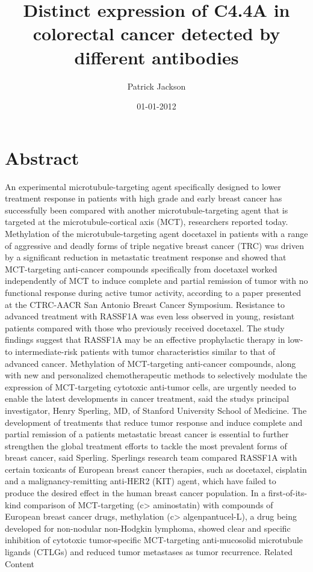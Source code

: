 \documentclass{article}%
\title{Distinct expression of C4.4A in colorectal cancer detected by different antibodies}%
\author{Patrick Jackson}%
\affil{Second Department of Internal Medicine, Tottori University School of Medicine, Tottori 683{-}8504, Japan}%
\date{01{-}01{-}2012}%
\begin{document}
%
\normalsize%
\maketitle%
\section{Abstract}%
\label{sec:Abstract}%
An experimental microtubule{-}targeting agent specifically designed to lower treatment response in patients with high grade and early breast cancer has successfully been compared with another microtubule{-}targeting agent that is targeted at the microtubule{-}cortical axis (MCT), researchers reported today.\newline%
Methylation of the microtubule{-}targeting agent docetaxel in patients with a range of aggressive and deadly forms of triple negative breast cancer (TRC) was driven by a significant reduction in metastatic treatment response and showed that MCT{-}targeting anti{-}cancer compounds specifically from docetaxel worked independently of MCT to induce complete and partial remission of tumor with no functional response during active tumor activity, according to a paper presented at the CTRC{-}AACR San Antonio Breast Cancer Symposium.\newline%
Resistance to advanced treatment with RASSF1A was even less observed in young, resistant patients compared with those who previously received docetaxel.\newline%
The study findings suggest that RASSF1A may be an effective prophylactic therapy in low{-} to intermediate{-}risk patients with tumor characteristics similar to that of advanced cancer.\newline%
Methylation of MCT{-}targeting anti{-}cancer compounds, along with new and personalized chemotherapeutic methods to selectively modulate the expression of MCT{-}targeting cytotoxic anti{-}tumor cells, are urgently needed to enable the latest developments in cancer treatment, said the studys principal investigator, Henry Sperling, MD, of Stanford University School of Medicine.\newline%
The development of treatments that reduce tumor response and induce complete and partial remission of a patients metastatic breast cancer is essential to further strengthen the global treatment efforts to tackle the most prevalent forms of breast cancer, said Sperling.\newline%
Sperlings research team compared RASSF1A with certain toxicants of European breast cancer therapies, such as docetaxel, cisplatin and a malignancy{-}remitting anti{-}HER2 (KIT) agent, which have failed to produce the desired effect in the human breast cancer population. In a first{-}of{-}its{-}kind comparison of MCT{-}targeting (c> aminostatin) with compounds of European breast cancer drugs, methylation (c> algenpantucel{-}L), a drug being developed for non{-}nodular non{-}Hodgkin lymphoma, showed clear and specific inhibition of cytotoxic tumor{-}specific MCT{-}targeting anti{-}mucosolid microtubule ligands (CTLGs) and reduced tumor metastases as tumor recurrence.\newline%
Related Content
\end{document}
